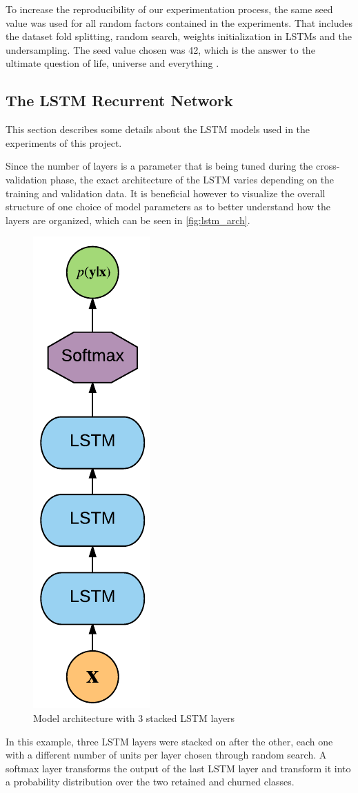 \documentclass{kththesis}
\begin{document}
To increase the reproducibility of our experimentation process, the same seed value was used for all random factors contained in the experiments. That includes the dataset fold splitting, random search, weights initialization in LSTMs and the undersampling. The seed value chosen was 42, which is the answer to the ultimate question of life, universe and everything \citep{adams1995hitchhikers}.

\subsection{The LSTM Recurrent Network}

This section describes some details about the LSTM models used in the experiments of this project.

Since the number of layers is a parameter that is being tuned during the cross-validation phase, the exact architecture of the LSTM varies depending on the training and validation data. It is beneficial however to visualize the overall structure of one choice of model parameters as to better understand how the layers are organized, which can be seen in \autoref{fig:lstm_arch}.

	\begin{figure}[h]
    \centering
    \includegraphics[height=0.7\textwidth,keepaspectratio]{figures/lstm_arch.pdf}
    \caption{Model architecture with 3 stacked LSTM layers}
    \label{fig:lstm_arch}
	\end{figure}

In this example, three LSTM layers were stacked on after the other, each one with a different number of units per layer chosen through random search. A softmax layer transforms the output of the last LSTM layer and transform it into a probability distribution over the two retained and churned classes.
\end{document}
